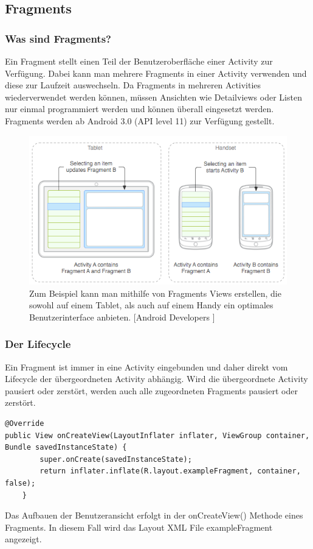 \documentclass[FIPLY_base.tex]{subfiles}
\begin{document}
\subsection{Fragments}
\subsubsection{Was sind Fragments?}
Ein Fragment stellt einen Teil der Benutzeroberfläche einer Activity zur Verfügung. Dabei kann man mehrere Fragments in einer Activity verwenden und diese zur Laufzeit auswechseln.
Da Fragments in mehreren Activities wiederverwendet werden können, müssen Ansichten wie Detailviews oder Listen nur einmal programmiert werden und können überall eingesetzt werden.
Fragments werden ab Android 3.0 (API level 11) zur Verfügung gestellt. 

\begin{figure}[H]
\includegraphics[scale=0.60]{img/fragments_modules}
\caption{Zum Beispiel kann man mithilfe von Fragments Views erstellen, die sowohl auf einem Tablet, als auch auf einem Handy ein optimales Benutzerinterface anbieten. 
[Android Developers \cite{adFragmentsGuide}]}
\end{figure}

\newpage
\subsubsection{Der Lifecycle}
Ein Fragment ist immer in eine Activity eingebunden und daher direkt vom Lifecycle der übergeordneten Activity abhängig.
Wird die übergeordnete Activity pausiert oder zerstört, werden auch alle zugeordneten Fragments pausiert oder zerstört. 

\begin{lstlisting}[caption={onCreateView() das ein Fragment anzeigt},label=DescriptiveLabel]
@Override
public View onCreateView(LayoutInflater inflater, ViewGroup container, Bundle savedInstanceState) {
        super.onCreate(savedInstanceState);
        return inflater.inflate(R.layout.exampleFragment, container, false);
    }
\end{lstlisting}
Das Aufbauen der Benutzeransicht erfolgt in der onCreateView() Methode eines Fragments. In diesem Fall wird das Layout XML File exampleFragment angezeigt.
\end{document}
